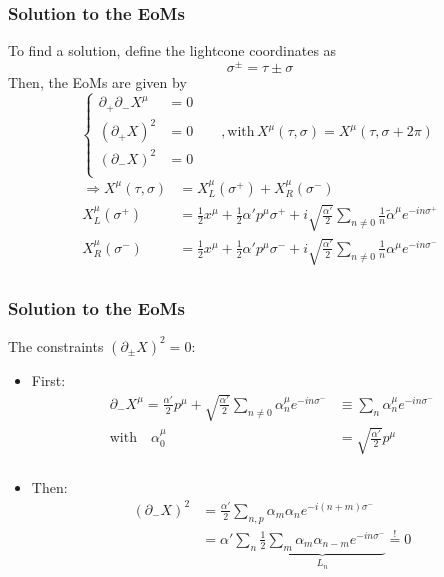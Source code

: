 \documentclass[aspectratio=169]{beamer}
\begin{document}
	\begin{frame}
		\frametitle{Solution to the EoMs}
		To find a solution, define the lightcone coordinates as
		\begin{equation*}
			\sigma^\pm = \tau\pm\sigma
		\end{equation*}
		Then, the EoMs are given by
		\begin{equation*}
			\begin{cases}
				\partial_+\partial_-X^\mu &= 0 \\
				(\partial_+X)^2 &= 0 \qquad, \text{with} \, X^\mu(\tau,\sigma) = X^\mu(\tau,\sigma+2\pi) \\
				(\partial_-X)^2 &= 0 \\
			\end{cases}
		\end{equation*}
		\begin{align*}
			\Rightarrow X^\mu(\tau,\sigma) & = X^\mu_L(\sigma^+) + X^\mu_R(\sigma^-) \\
			X^\mu_{L}(\sigma^+) &= \frac{1}{2}x^\mu + \frac{1}{2} \alpha' p^\mu \sigma^+ + i\sqrt{\frac{\alpha'}{2}} \sum_{n\neq 0} \frac{1}{n} \tilde{\alpha}^\mu e^{-in\sigma^+} \\
			X^\mu_{R}(\sigma^-) &= \frac{1}{2}x^\mu + \frac{1}{2} \alpha' p^\mu \sigma^- + i\sqrt{\frac{\alpha'}{2}} \sum_{n\neq 0} \frac{1}{n} \alpha^\mu e^{-in\sigma^-} \\
		\end{align*}
	\end{frame}

	\begin{frame}
		\frametitle{Solution to the EoMs}
		The constraints $\left(\partial_\pm X\right)^2 = 0$:
		\begin{itemize}
			\item First:
			\begin{align*}
				\partial_- X^\mu = \frac{\alpha'}{2} p^\mu + \sqrt{\frac{\alpha'}{2}} \sum_{n\neq 0 } \alpha^\mu_n e^{-in\sigma^-} & \equiv \sum_{n} \alpha^\mu_n e^{-in\sigma^-} \\
				\text{with} \quad \alpha^\mu_0 & = \sqrt{\frac{\alpha'}{2}}p^\mu \\
			\end{align*}
			\item Then:
			\begin{align*}
				\left(\partial_-X\right)^2 &= \frac{\alpha'}{2} \sum_{n,p} \alpha_m \alpha_n e^{-i(n+m)\sigma^-}\\
				& = \alpha' \sum_n \underbrace{\frac{1}{2} \sum_m \alpha_m \alpha_{n-m} e^{-in\sigma^-}}_{L_n} \stackrel{!}{=} 0
			\end{align*}
		\end{itemize}
	\end{frame}
\end{document}

